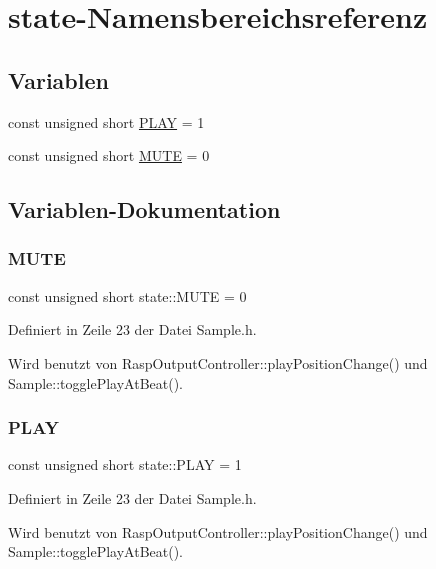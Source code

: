 \hypertarget{namespacestate}{}\section{state-\/\+Namensbereichsreferenz}
\label{namespacestate}
\subsection*{Variablen}
\begin{DoxyCompactItemize}
\item 
const unsigned short \hyperlink{namespacestate_afea5348759175ad498402b0148f8b6b2}{P\+L\+AY} = 1
\item 
const unsigned short \hyperlink{namespacestate_a925633150a5fb17786e9c8d9aaa69c9d}{M\+U\+TE} = 0
\end{DoxyCompactItemize}


\subsection{Variablen-\/\+Dokumentation}
\mbox{\label{namespacestate_a925633150a5fb17786e9c8d9aaa69c9d}} 
\subsubsection{\texorpdfstring{M\+U\+TE}{MUTE}}
{\footnotesize\ttfamily const unsigned short state\+::\+M\+U\+TE = 0}



Definiert in Zeile 23 der Datei Sample.\+h.



Wird benutzt von Rasp\+Output\+Controller\+::play\+Position\+Change() und Sample\+::toggle\+Play\+At\+Beat().

\mbox{\label{namespacestate_afea5348759175ad498402b0148f8b6b2}} 
\subsubsection{\texorpdfstring{P\+L\+AY}{PLAY}}
{\footnotesize\ttfamily const unsigned short state\+::\+P\+L\+AY = 1}



Definiert in Zeile 23 der Datei Sample.\+h.



Wird benutzt von Rasp\+Output\+Controller\+::play\+Position\+Change() und Sample\+::toggle\+Play\+At\+Beat().

